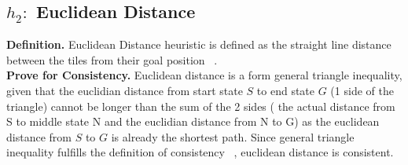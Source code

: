 \documentclass[runningheads]{llncs}
\begin{document}
\subsection{\(h_2:\) Euclidean Distance}
\textbf{Definition.} Euclidean Distance heuristic is defined as the straight line distance between the tiles from their goal position ~\cite{rosalind_euclidean_nodate}. \\
\textbf{Prove for Consistency.} Euclidean distance is a form general triangle inequality, given that the euclidian distance from start state \( S \) to end state \( G \) (1 side of the triangle) cannot be longer than the sum of the 2 sides ( the actual distance from S to middle state N and the euclidian distance from N to G) as the euclidean distance from \( S \) to \( G \) is already the shortest path. 
Since general triangle inequality fulfills the definition of consistency ~\cite[p95]{stuart_russell_artifical_2010}, euclidean distance is consistent.

\end{document}
